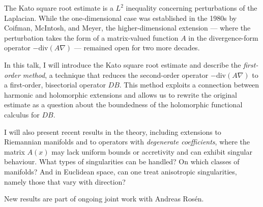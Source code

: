 {%
    The Kato square root estimate is a $L^2$ inequality concerning
    perturbations of the Laplacian. While the one-dimensional case was
    established in the 1980s by Coifman, McIntosh, and Meyer,
    the higher-dimensional extension — where the perturbation takes the
    form of a matrix-valued function $A$ in the divergence-form operator
    $-\mathrm{div}(A \nabla)$ — remained open for two more decades.

    In this talk, I will introduce the Kato square root estimate and
    describe the \emph{first-order method}, a technique that reduces the
    second-order operator $-\mathrm{div}(A \nabla)$ to a first-order,
    bisectorial operator $DB$. This method exploits a connection between
    harmonic and holomorphic extensions and allows us to rewrite the
    original estimate as a question about the boundedness of the
    holomorphic functional calculus for $D B$.

    I will also present recent results in the theory, including extensions
    to Riemannian manifolds and to operators with \emph{degenerate
    coefficients}, where the matrix $A(x)$ may lack uniform bounds or
    accretivity and can exhibit singular behaviour. What types of
    singularities can be handled? On which classes of manifolds? And in
    Euclidean space, can one treat anisotropic singularities, namely
    those that vary with direction? 

    New results are part of ongoing joint work with Andreas Rosén.  
}
